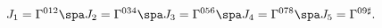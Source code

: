 \begin{equation}
\label{theJs}
J_1 = \Gamma^{012} \spa
J_2 = \Gamma^{034} \spa
J_3 = \Gamma^{056} \spa
J_4 = \Gamma^{078} \spa
J_5 = \Gamma^{09\sharp}.
\end{equation}

